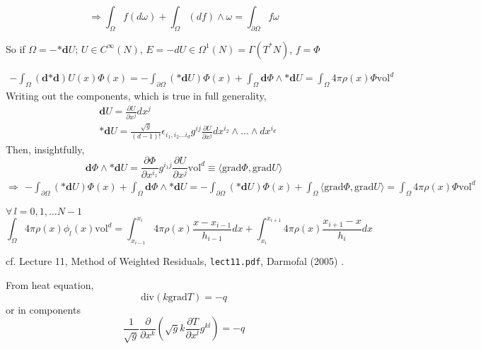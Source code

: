 \documentclass[10pt]{amsart}
\begin{document}
\begin{multicols*}{2}
\begin{equation}
  \Longrightarrow \int_{\Omega} f(d\omega) + \int_{\Omega} (df ) \wedge \omega = \int_{\partial \Omega} f \omega
  \end{equation}

So if $\Omega = - \mathbf{*} \mathbf{d}U$; $U\in C^{\infty}(N)$, $E = -dU \in \Omega^1(N) = \Gamma(T^*N)$, $f=\Phi$

\[
\begin{gathered}
  -\int_{\Omega} (\mathbf{d}\mathbf{*}\mathbf{d})U(x)\Phi(x) = -\int_{\partial \Omega} (\mathbf{*} \mathbf{d}U) \Phi(x) + \int_{\Omega} \mathbf{d}\Phi \wedge \mathbf{*}\mathbf{d}U = \int_{\Omega} 4\pi \rho(x)\Phi\text{vol}^d
\end{gathered}
\]
Writing out the components, which is true in full generality,
\[
\begin{aligned}
  & \mathbf{d}U = \frac{ \partial U}{ \partial x^j} dx^j \\ 
  & \mathbf{*}\mathbf{d}U = \frac{ \sqrt{g}}{ (d-1)!} \epsilon_{i_1 , i_2 \dots i_d} g^{ij} \frac{ \partial U}{ \partial x^j} dx^{i_2} \wedge \dots \wedge dx^{i_d} 
  \end{aligned}
\]
Then, insightfully,
\[
\mathbf{d}\Phi \wedge \mathbf{*} \mathbf{d}U = \frac{ \partial \Phi }{ \partial x^{i_1} } g^{i_1 j} \frac{ \partial U}{ \partial x^j} \text{vol}^d \equiv \langle \text{grad} \Phi, \text{grad} U \rangle
\]
\begin{equation}
  \Longrightarrow
  \begin{gathered}
-\int_{\partial \Omega} (\mathbf{*}\mathbf{d}U ) \Phi(x) + \int_{\Omega} \mathbf{d}\Phi \wedge \mathbf{*}\mathbf{d}U = - \int_{\partial \Omega} (\mathbf{*}\mathbf{d}U ) \Phi(x) + \int_{\Omega} \langle \text{grad}\Phi, \text{grad}U \rangle = \int_{\Omega} 4\pi \rho(x) \Phi \text{vol}^d
    \end{gathered}
  \end{equation}


$\forall \, l = 0,1, \dots N-1$
\[
\int_{\Omega} 4\pi \rho(x) \phi_l(x) \text{vol}^d = \int_{x_{i-1}}^{ x_i} 4\pi \rho(x) \frac{ x- x_{i-1} }{h_{i-1} } dx + \int_{x_i}^{ x_{i+1}} 4\pi \rho(x) \frac{ x_{i+1} - x}{h_i} dx
\]

cf. Lecture 11, Method of Weighted Residuals, \verb|lect11.pdf|, Darmofal (2005) \cite{Darm2005}.

From heat equation,
\begin{equation}
  \text{div}(k\text{grad}T) = -q 
  \end{equation}
or in components
\[
\frac{1}{\sqrt{g}} \frac{ \partial }{ \partial x^k} \left(\sqrt{g} k \frac{ \partial T}{ \partial x^l} g^{kl} \right) = -q
\]


\end{multicols*}
\end{document}
